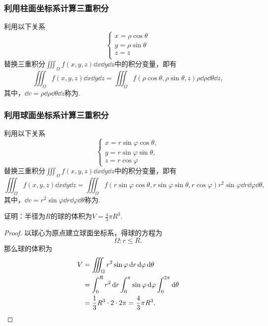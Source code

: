 \subsubsection{利用柱面坐标系计算三重积分}
利用以下关系\[
\left\{ \begin{array}{l}
x = \rho\cos\theta \\
y = \rho\sin\theta \\
z = z \\
\end{array} \right.
\]替换三重积分\(\iiint_{\Omega}{f(x,y,z)\dd{x}\dd{y}\dd{z}}\)中的积分变量，即有\[
\iiint_{\Omega}{f(x,y,z)\dd{x}\dd{y}\dd{z}}
= \iiint_{\Omega}{f(\rho \cos\theta,\rho \sin\theta,z) \rho \dd{\rho} \dd{\theta} \dd{z}},
\]其中，\(\dd{v} = \rho \dd{\rho} \dd{\theta} \dd{z}\)称为.

\subsubsection{利用球面坐标系计算三重积分}
利用以下关系\[
\left\{ \begin{array}{l}
x = r \sin\varphi \cos\theta, \\
y = r \sin\varphi \sin\theta, \\
z = r \cos\varphi
\end{array} \right.
\]替换三重积分\(\iiint_{\Omega}{f(x,y,z)\dd{x}\dd{y}\dd{z}}\)中的积分变量，即有\[
\iiint_{\Omega}{f(x,y,z)\dd{x}\dd{y}\dd{z}}
= \iiint_{\Omega}{f(r \sin\varphi \cos\theta,r \sin\varphi \sin\theta,r \cos\varphi) r^2 \sin\varphi \dd{r} \dd{\varphi} \dd{\theta}},
\]其中，\(\dd{v} = r^2 \sin\varphi \dd{r} \dd{\varphi} \dd{\theta}\)称为.

\begin{example}
证明：半径为\(R\)的球的体积为\(V = \frac{4}{3} \pi R^3\).
\begin{proof}
以球心为原点建立球面坐标系，得球的方程为\[
\Omega: r \leqslant R.
\]那么球的体积为\begin{align*}
V &= \iiint_{\Omega} r^2 \sin\varphi \dd{r} \dd{\varphi} \dd{\theta} \\
&= \int_0^R r^2 \dd{r} \int_0^{\pi} \sin\varphi \dd{\varphi} \int_0^{2\pi} \dd{\theta} \\
&= \frac{1}{3} R^3 \cdot 2 \cdot 2\pi
= \frac{4}{3} \pi R^3.
\qedhere
\end{align*}
\end{proof}
\end{example}


